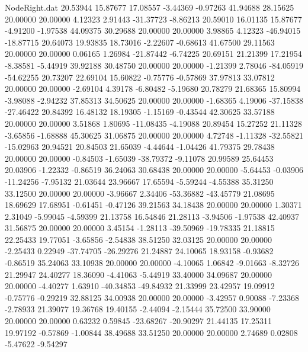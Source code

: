 \begin{filecontents}{NodeRight.dat}
  20.53944   15.87677   17.08557    -3.44369   -0.97263   41.94688   28.15625   20.00000   20.00000    4.12323    2.91443  -31.37723   -8.86213
  20.59010   16.01135   15.87677    -4.91200   -1.97538   44.09375   30.29688   20.00000   20.00000    3.98865    4.12323  -46.94015  -18.87715
  20.64073   19.93835   18.73016    -2.22607   -0.68613   41.67500   29.11563   20.00000   20.00000    0.06165    1.26984  -21.87442   -6.74225
  20.69151   21.21399   17.21954    -8.38581   -5.44919   39.92188   30.48750   20.00000   20.00000   -1.21399    2.78046  -84.05919  -54.62255
  20.73207   22.69104   15.60822    -0.75776   -0.57869   37.97813   33.07812   20.00000   20.00000   -2.69104    4.39178   -6.80482   -5.19680
  20.78279   21.68365   15.80994    -3.98088   -2.94232   37.85313   34.50625   20.00000   20.00000   -1.68365    4.19006  -37.15838  -27.46422
  20.84392   16.48132   18.19305    -1.15169   -0.43544   42.30625   33.57188   20.00000   20.00000    3.51868    1.80695  -11.08435   -4.19088
  20.89454   15.27252   21.11328    -3.65856   -1.68888   45.30625   31.06875   20.00000   20.00000    4.72748   -1.11328  -32.55821  -15.02963
  20.94521   20.84503   21.65039    -4.44644   -1.04426   41.79375   29.78438   20.00000   20.00000   -0.84503   -1.65039  -38.79372   -9.11078
  20.99589   25.64453   20.03906    -1.22332   -0.86519   36.24063   30.68438   20.00000   20.00000   -5.64453   -0.03906  -11.24256   -7.95132
  21.03644   23.96667   17.65594    -5.59244   -4.55388   35.31250   33.12500   20.00000   20.00000   -3.96667    2.34406  -53.36882  -43.45779
  21.08695   18.69629   17.68951    -0.61451   -0.47126   39.21563   34.18438   20.00000   20.00000    1.30371    2.31049   -5.99045   -4.59399
  21.13758   16.54846   21.28113    -3.94506   -1.97538   42.40937   31.56875   20.00000   20.00000    3.45154   -1.28113  -39.50969  -19.78335
  21.18815   22.25433   19.77051    -3.65856   -2.54838   38.51250   32.03125   20.00000   20.00000   -2.25433    0.22949  -37.74705  -26.29276
  21.24887   24.10065   18.93158    -0.93682   -0.86519   35.24063   33.10938   20.00000   20.00000   -4.10065    1.06842   -9.01663   -8.32726
  21.29947   24.40277   18.36090    -4.41063   -5.44919   33.40000   34.09687   20.00000   20.00000   -4.40277    1.63910  -40.34853  -49.84932
  21.33999   23.42957   19.09912    -0.75776   -0.29219   32.88125   34.00938   20.00000   20.00000   -3.42957    0.90088   -7.23368   -2.78933
  21.39077   19.36768   19.40155    -2.44094   -2.15444   35.72500   33.90000   20.00000   20.00000    0.63232    0.59845  -23.68267  -20.90297
  21.44135   17.25311   19.97192    -0.57869   -1.00844   38.49688   33.51250   20.00000   20.00000    2.74689    0.02808   -5.47622   -9.54297

\end{filecontents}
